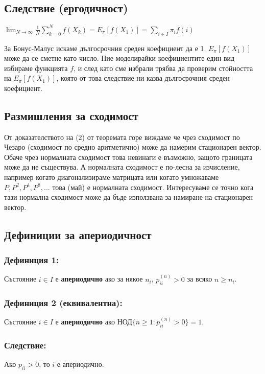 \documentclass{article}
\begin{document}
\subsection{Следствие (ергодичност)}
$\lim_{N\to\infty} \frac{1}{N}\sum_{k=0}^N f(X_k) = E_\pi[f(X_1)] = \sum_{i \in I} \pi_i f(i)$

За Бонус-Малус искаме дългосрочния среден коефициент да е 1. $E_\pi[f(X_1)]$ може да се сметне като число. 
Ние моделирайки коефициентите един вид избираме функцията $f$, и след като сме избрали трябва да проверим 
стойността на $E_\pi[f(X_1)]$, която от това следствие ни казва дългосрочния среден коефициент.

\subsection{Размишления за сходимост}
От доказателството на (2) от теоремата горе виждаме че чрез сходимост по Чезаро (сходимост 
по средно аритметично) може да намерим стационарен вектор. Обаче чрез нормалната сходимост това невинаги е възможно, 
защото границата може да не съществува. А нормалната сходимост е по-лесна за изчисление, например когато 
диагонализираме матрицата или когато умножаваме $P, P^2, P^4, P^8,...$ това (май) е нормалната сходимост. 
Интересуваме се точно кога тази нормална сходимост може да бъде използвана за намиране на стационарен вектор.

\subsection{Дефиниции за апериодичност}
\subsubsection*{Дефиниция 1:}
Състояние $i \in I$ е \textbf{апериодично} ако за някое $n_i$, $p_{ii}^{(n)} > 0$ за всяко $n \geq n_i$.

\subsubsection*{Дефиниция 2 (еквивалентна):}
Състояние $i \in I$ е \textbf{апериодично} ако $\text{НОД}\{n \geq 1 : p_{ii}^{(n)} > 0\} = 1$.

\subsubsection*{Следствие:}
Ако $p_{ii} > 0$, то $i$ е апериодично.
\end{document}
